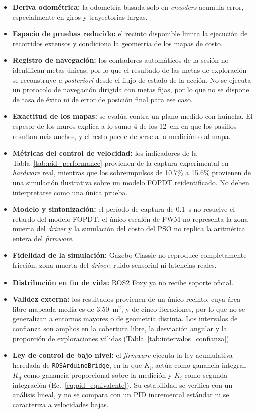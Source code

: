 \begin{itemize}
\item \textbf{Deriva odométrica:} la odometría basada solo en \textit{encoders} acumula error, especialmente en giros y trayectorias largas.
\item \textbf{Espacio de pruebas reducido:} el recinto disponible limita la ejecución de recorridos extensos y condiciona la geometría de los mapas de costo.
\item \textbf{Registro de navegación:} los contadores automáticos de la sesión no identifican metas únicas, por lo que el resultado de las metas de exploración se reconstruye \textit{a posteriori} desde el flujo de estado de la acción. No se ejecuta un protocolo de navegación dirigida con metas fijas, por lo que no se dispone de tasa de éxito ni de error de posición final para ese caso.
\item \textbf{Exactitud de los mapas:} se evalúa contra un plano medido con huincha. El espesor de los muros explica a lo sumo 4 de los 12~cm en que los pasillos resultan más anchos, y el resto puede deberse a la medición o al mapa.
\item \textbf{Métricas del control de velocidad:} los indicadores de la Tabla~\ref{tab:pid_performance} provienen de la captura experimental en \textit{hardware} real, mientras que los sobreimpulsos de 10.7\% a 15.6\% provienen de una simulación ilustrativa sobre un modelo FOPDT reidentificado. No deben interpretarse como una única prueba.
\item \textbf{Modelo y sintonización:} el período de captura de 0.1~s no resuelve el retardo del modelo FOPDT, el único escalón de PWM no representa la zona muerta del \textit{driver} y la simulación del costo del PSO no replica la aritmética entera del \textit{firmware}.
\item \textbf{Fidelidad de la simulación:} Gazebo Classic no reproduce completamente fricción, zona muerta del \textit{driver}, ruido sensorial ni latencias reales.
\item \textbf{Distribución en fin de vida:} \gls{ROS2} Foxy ya no recibe soporte oficial.
\item \textbf{Validez externa:} los resultados provienen de un único recinto, cuya área libre mapeada media es de 3.50~m$^2$, y de cinco iteraciones, por lo que no se generalizan a entornos mayores o de geometría distinta. Los intervalos de confianza son amplios en la cobertura libre, la desviación angular y la proporción de exploraciones válidas (Tabla~\ref{tab:intervalos_confianza}).
\item \textbf{Ley de control de bajo nivel:} el \textit{firmware} ejecuta la ley acumulativa heredada de \texttt{ROSArduinoBridge}, en la que $K_p$ actúa como ganancia integral, $K_d$ como ganancia proporcional sobre la medición y $K_i$ como segunda integración (Ec.~\eqref{eq:pid_equivalente}). Su estabilidad se verifica con un análisis lineal, y no se compara con un PID incremental estándar ni se caracteriza a velocidades bajas.

\end{itemize}

